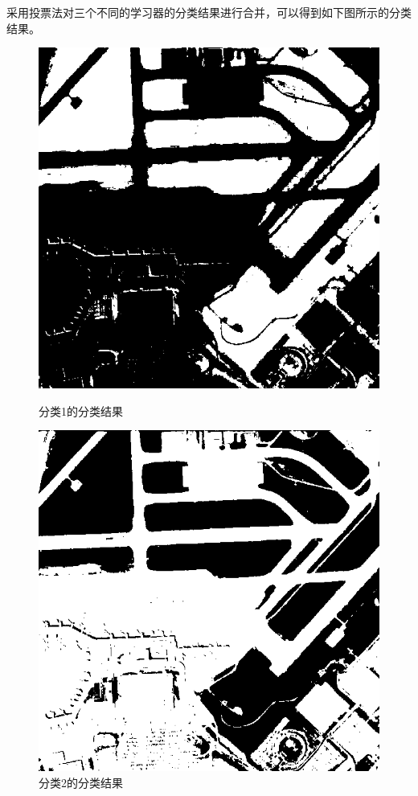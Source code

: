 采用投票法对三个不同的学习器的分类结果进行合并，可以得到如下图所示的分类结果。
\begin{figure}[H]
	\centering	\begin{minipage}{0.45\linewidth}
		\includegraphics[width=\linewidth]{figure/airport_44_Class_1.png}
		\caption{分类1的分类结果}
	\end{minipage}
	\begin{minipage}{0.45\linewidth}
		\includegraphics[width=\linewidth]{figure/airport_44_Class_2.png}
		\caption{分类2的分类结果}
	\end{minipage}
\end{figure}
